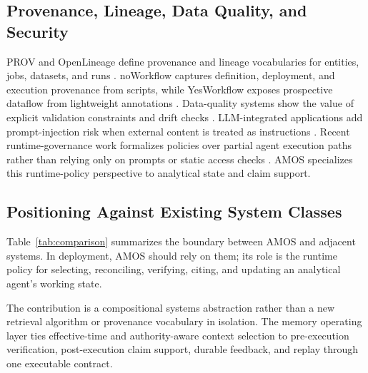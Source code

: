 \documentclass[10pt]{article}
\newcommand{\amos}{\textsc{AMOS}\xspace}
\begin{document}
\subsection{Provenance, Lineage, Data Quality, and Security}
PROV and OpenLineage define provenance and lineage vocabularies for entities, jobs, datasets, and runs \cite{provdm,openlineage}. noWorkflow captures definition, deployment, and execution provenance from scripts, while YesWorkflow exposes prospective dataflow from lightweight annotations \cite{noworkflow,yesworkflow}. Data-quality systems show the value of explicit validation constraints and drift checks \cite{deequ,tfdv}. LLM-integrated applications add prompt-injection risk when external content is treated as instructions \cite{owasp,greshake2023indirect,yi2023bipia}. Recent runtime-governance work formalizes policies over partial agent execution paths rather than relying only on prompts or static access checks \cite{runtimegovernance}. \amos specializes this runtime-policy perspective to analytical state and claim support.

\subsection{Positioning Against Existing System Classes}
Table~\ref{tab:comparison} summarizes the boundary between \amos and adjacent systems. In deployment, \amos should rely on them; its role is the runtime policy for selecting, reconciling, verifying, citing, and updating an analytical agent's working state.

The contribution is a compositional systems abstraction rather than a new retrieval algorithm or provenance vocabulary in isolation. The memory operating layer ties effective-time and authority-aware context selection to pre-execution verification, post-execution claim support, durable feedback, and replay through one executable contract.
\end{document}
